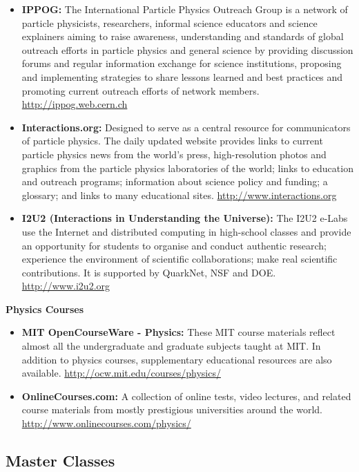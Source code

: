 \begin{itemize}
\item
  \textbf{IPPOG:} The International Particle Physics Outreach Group is a
  network of particle physicists, researchers, informal science
  educators and science explainers aiming to raise awareness,
  understanding and standards of global outreach efforts in particle
  physics and general science by providing discussion forums and regular
  information exchange for science institutions, proposing and
  implementing strategies to share lessons learned and best practices
  and promoting current outreach efforts of network members.
  \url{http://ippog.web.cern.ch}
\item
  \textbf{Interactions.org:} Designed to serve as a central resource for
  communicators of particle physics. The daily updated website provides
  links to current particle physics news from the world's press,
  high-resolution photos and graphics from the particle physics
  laboratories of the world; links to education and outreach programs;
  information about science policy and funding; a glossary; and links to
  many educational sites. \url{http://www.interactions.org}
\item
  \textbf{I2U2 (Interactions in Understanding the Universe):} The I2U2
  e-Labs use the Internet and distributed computing in high-school
  classes and provide an opportunity for students to organise and
  conduct authentic research; experience the environment of scientific
  collaborations; make real scientific contributions. It is supported by
  QuarkNet, NSF and DOE. \url{http://www.i2u2.org}
\end{itemize}

\textbf{Physics Courses}

\begin{itemize}
\item
  \textbf{MIT OpenCourseWare - Physics:} These MIT course materials
  reflect almost all the undergraduate and graduate subjects taught at
  MIT. In addition to physics courses, supplementary educational
  resources are also available.
  \url{http://ocw.mit.edu/courses/physics/}
\item
  \textbf{OnlineCourses.com:} A collection of online tests, video
  lectures, and related course materials from mostly prestigious
  universities around the world.
  \url{http://www.onlinecourses.com/physics/}
\end{itemize}

\subsection{Master Classes}\label{master-classes}

